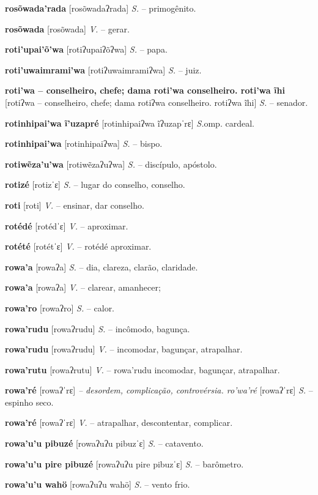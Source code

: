 \textbf{rosõwada'rada} [rosõwadaʔrada] \textit{S.} -- primogênito.

\textbf{rosõwada} [rosõwada] \textit{V.} -- gerar.

\textbf{roti'upai'õ'wa} [rotiʔupaiʔõʔwa] \textit{S.} -- papa.

\textbf{roti'uwaimrami'wa} [rotiʔuwaimramiʔwa] \textit{S.} -- juiz.

\textbf{roti'wa -- conselheiro, chefe; dama roti'wa conselheiro. roti'wa ĩhi} [rotiʔwa -- conselheiro, chefe; dama rotiʔwa conselheiro. rotiʔwa ĩhi] \textit{S.} -- senador.

\textbf{rotinhipai'wa ĩ'uzapré} [rotinhipaiʔwa ĩʔuzapˈrɛ] \textit{S.}omp. cardeal.

\textbf{rotinhipai'wa} [rotinhipaiʔwa] \textit{S.} -- bispo.

\textbf{rotiwẽza'u'wa} [rotiwẽzaʔuʔwa] \textit{S.} -- discípulo, apóstolo.

\textbf{rotizé} [rotizˈɛ] \textit{S.} -- lugar do conselho, conselho.

\textbf{roti} [roti] \textit{V.} -- ensinar, dar conselho.

\textbf{rotédé} [rotédˈɛ] \textit{V.} -- aproximar.

\textbf{rotété} [rotétˈɛ] \textit{V.} -- rotédé aproximar.

\textbf{rowa'a} [rowaʔa] \textit{S.} -- dia, clareza, clarão, claridade.

\textbf{rowa'a} [rowaʔa] \textit{V.} -- clarear, amanhecer;

\textbf{rowa'ro} [rowaʔro] \textit{S.} -- calor.

\textbf{rowa'rudu} [rowaʔrudu] \textit{S.} -- incômodo, bagunça.

\textbf{rowa'rudu} [rowaʔrudu] \textit{V.} -- incomodar, bagunçar, atrapalhar.

\textbf{rowa'rutu} [rowaʔrutu] \textit{V.} -- rowa'rudu incomodar, bagunçar, atrapalhar.

\textbf{rowa'ré} [rowaʔˈrɛ] \textit{-- desordem, complicação, controvérsia. ro'wa'ré} [rowaʔˈrɛ] \textit{S.} -- espinho seco.

\textbf{rowa'ré} [rowaʔˈrɛ] \textit{V.} -- atrapalhar, descontentar, complicar.

\textbf{rowa'u'u pibuzé} [rowaʔuʔu pibuzˈɛ] \textit{S.} -- catavento.

\textbf{rowa'u'u pire pibuzé} [rowaʔuʔu pire pibuzˈɛ] \textit{S.} -- barômetro.

\textbf{rowa'u'u wahö} [rowaʔuʔu wahö] \textit{S.} -- vento frio.


